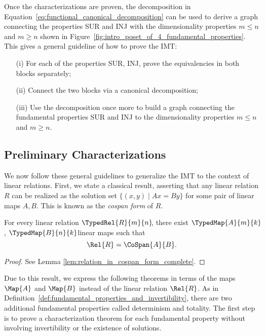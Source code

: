 \documentclass[manyauthors]{fundam}
\begin{document}
Once the characterizations are proven, the decomposition in Equation~\eqref{eq:functional_canonical_decomposition}
can be used to derive a graph connecting the properties SUR and INJ with the dimensionality properties $m \leq n$ and $m \geq n$ shown in Figure~\ref{fig:intro_poset_of_4_fundamental_properties}.
This gives a general guideline of how to prove the IMT:
\begin{enumerate}
    \item[(i)] For each of the properties SUR, INJ, prove the equivalencies in both blocks separately;
    \item[(ii)] Connect the two blocks via a canonical decomposition;
    \item[(iii)] Use the decomposition once more to build a graph connecting the fundamental properties SUR and INJ to the dimensionality properties $m \leq n$ and $m \geq n$.
\end{enumerate}

\subsection{Preliminary Characterizations}

We now follow these general guidelines to generalize the IMT to the context of linear relations.
First, we state a classical result,
asserting that any linear relation $R$ can be realized as the solution set $\{(x, y) \mid Ax = By\}$
for some pair of linear maps $A, B$.
This is known as the \emph{cospan form} of $R$.

\begin{proposition}\label{prop:cospan}
For every linear relation $\TypedRel{R}{m}{n}\!$, there exist $\TypedMap{A}{m}{k}\!\!$, $\TypedMap{B}{n}{k}\!\!$ linear maps such that
\[\Rel{R} = \CoSpan{A}{B}.\]
\end{proposition}
\begin{proof}
   See Lemma \ref{lem:relation_in_cospan_form_complete}.
\end{proof}

Due to this result, we express the following theorems in terms of the maps $\Map{A}$ and $\Map{B}$ instead of the linear relation $\Rel{R}$.
As in Definition~\ref{def:fundamental_properties_and_invertibility}, there are two additional fundamental properties called determinism and totality.
The first step is to prove a characterization theorem for each fundamental property
without involving invertibility or the existence of solutions.
\end{document}
